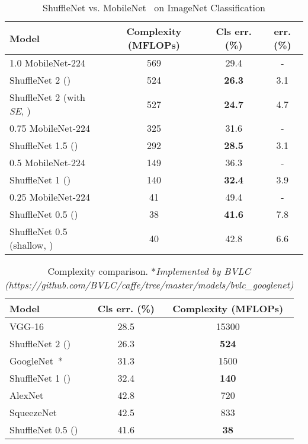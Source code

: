 \documentclass[10pt,twocolumn,letterpaper]{article}
\begin{document}
\begin{table*}[h]
	\begin{center}
		\begin{tabular}{l|c|c|c}
			\hline
			Model & Complexity (MFLOPs) & Cls err. (\%) &  err. (\%) \\
			\hline\hline
			1.0 MobileNet-224 & 569 & 29.4 & - \\
			ShuffleNet 2 () & 524 & \textbf{26.3} & 3.1 \\
			ShuffleNet 2 (with \emph{SE}\cite{hu2017squeeze}, ) & 527 & \textbf{24.7} & 4.7 \\
			\hline
			0.75 MobileNet-224 & 325 & 31.6 & - \\
			ShuffleNet 1.5 () & 292 & \textbf{28.5} & 3.1 \\
			\hline
			0.5 MobileNet-224 & 149 & 36.3 & - \\
			ShuffleNet 1 () & 140 & \textbf{32.4} & 3.9 \\
			\hline
			0.25 MobileNet-224 & 41 & 49.4 & - \\
			ShuffleNet 0.5 () & 38 & \textbf{41.6} & 7.8 \\
			ShuffleNet 0.5 (shallow, ) & 40 & 42.8 & 6.6 \\
			\hline
		\end{tabular}
	\end{center}
	\caption{ ShuffleNet vs. MobileNet~\cite{howard2017mobilenets} on ImageNet Classification }\label{tbl:mobilecls}
\end{table*}

\begin{table*}[h]
	\begin{center}
		\begin{tabular}{l|c|c}
			\hline
			Model & Cls err. (\%) & Complexity (MFLOPs) \\
			\hline\hline
			VGG-16~\cite{simonyan2014very} & 28.5 & 15300 \\
			ShuffleNet 2 () & 26.3 & \textbf{524} \\
			\hline
			GoogleNet~\cite{szegedy2015going}* & 31.3 & 1500 \\
			ShuffleNet 1 () & 32.4 & \textbf{140} \\
			\hline
			AlexNet~\cite{krizhevsky2012imagenet} & 42.8 & 720 \\
			SqueezeNet~\cite{iandola2016squeezenet} & 42.5 & 833 \\
			ShuffleNet 0.5 () & 41.6 & \textbf{38} \\
			\hline 
		\end{tabular}
	\end{center}
	\caption{ Complexity comparison. *\emph{Implemented by BVLC (https://github.com/BVLC/caffe/tree/master/models/bvlc\_googlenet)} }
	\label{tbl:complexity}
\end{table*}
\end{document}
